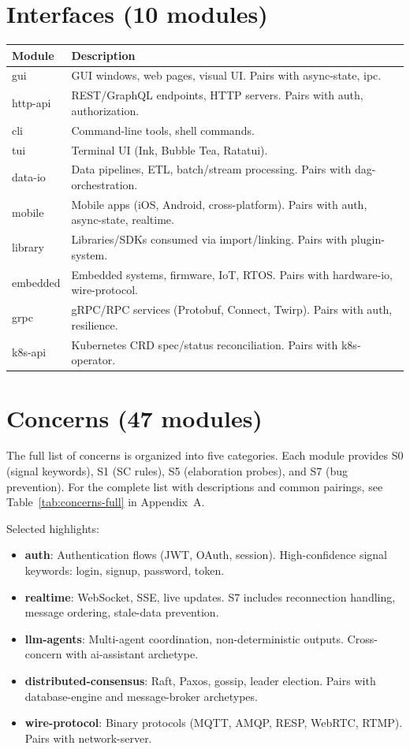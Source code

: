 \documentclass[11pt,a4paper,openright,twoside]{report}
\begin{document}
\section{Interfaces (10 modules)}

\begin{longtable}{lp{8cm}}
\toprule
\textbf{Module} & \textbf{Description} \\
\midrule
\endhead
gui & GUI windows, web pages, visual UI. Pairs with async-state, ipc. \\
http-api & REST/GraphQL endpoints, HTTP servers. Pairs with auth, authorization. \\
cli & Command-line tools, shell commands. \\
tui & Terminal UI (Ink, Bubble Tea, Ratatui). \\
data-io & Data pipelines, ETL, batch/stream processing. Pairs with dag-orchestration. \\
mobile & Mobile apps (iOS, Android, cross-platform). Pairs with auth, async-state, realtime. \\
library & Libraries/SDKs consumed via import/linking. Pairs with plugin-system. \\
embedded & Embedded systems, firmware, IoT, RTOS. Pairs with hardware-io, wire-protocol. \\
grpc & gRPC/RPC services (Protobuf, Connect, Twirp). Pairs with auth, resilience. \\
k8s-api & Kubernetes CRD spec/status reconciliation. Pairs with k8s-operator. \\
\bottomrule
\end{longtable}

\section{Concerns (47 modules)}

The full list of concerns is organized into five categories. Each module provides S0 (signal keywords), S1 (SC rules), S5 (elaboration probes), and S7 (bug prevention). For the complete list with descriptions and common pairings, see Table~\ref{tab:concerns-full} in Appendix~A.

Selected highlights:

\begin{itemize}
  \item \textbf{auth}: Authentication flows (JWT, OAuth, session). High-confidence signal keywords: login, signup, password, token.
  \item \textbf{realtime}: WebSocket, SSE, live updates. S7 includes reconnection handling, message ordering, stale-data prevention.
  \item \textbf{llm-agents}: Multi-agent coordination, non-deterministic outputs. Cross-concern with ai-assistant archetype.
  \item \textbf{distributed-consensus}: Raft, Paxos, gossip, leader election. Pairs with database-engine and message-broker archetypes.
  \item \textbf{wire-protocol}: Binary protocols (MQTT, AMQP, RESP, WebRTC, RTMP). Pairs with network-server.
\end{itemize}
\end{document}
